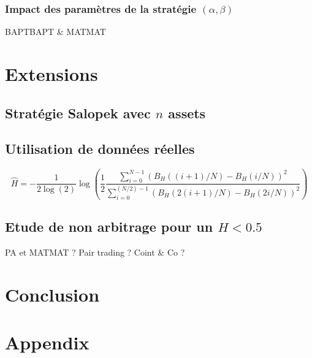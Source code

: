 \documentclass[12pt,a4paper]{article}
\begin{document}
\subsubsection{Impact des paramètres de la stratégie $(\alpha, \beta)$}\label{subsubsec:strategiesalopekstrategyparam}
BAPTBAPT \& MATMAT

\section{Extensions}\label{sec:extensions}
\subsection{Stratégie Salopek avec $n$ assets}
\subsection{Utilisation de données réelles}
\begin{equation}
\hat{H} = -\frac{1}{2 \log(2)} \log \left( \frac{1}{2} \frac{\sum_{i=0}^{N-1} (B_H((i+1)/N) - B_H(i/N))^2}{\sum_{i=0}^{(N/2)-1} (B_H(2(i+1)/N) - B_H(2i/N))^2} \right) \label{eq:hurst_exponent}
\end{equation}

\subsection{Etude de non arbitrage pour un $H<0.5$}
PA et MATMAT ? Pair trading ? Coint \& Co ?
\section{Conclusion}\label{sec:conclusion}

\cite{lamert2023discretization}
\cite{shinozuka1972}
\cite{shiryaev1998}
\cite{yin1996}
\printbibliography

 \section{Appendix}\label{sec:appendix}
\end{document}
